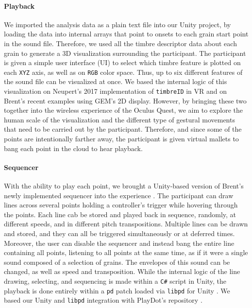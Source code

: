 \documentclass{nime-alternate}
\begin{document}
\paragraph{Playback}

We imported the analysis data as a plain text file into our Unity project, by loading the data into internal arrays that point to onsets to each grain start point in the sound file. Therefore, we used all the timbre descriptor data about each grain to generate a 3D visualization surrounding the participant. The participant is given a simple user interface (UI) to select which timbre feature is plotted on each \texttt{XYZ} axis, as well as on \texttt{RGB} color space. Thus, up to six different features of the sound file can be visualized at once. We based the internal logic of this visualization on Neupert's 2017 implementation of \texttt{timbreID} in VR and on Brent's recent examples using GEM's 2D display. However, by bringing these two together into the wireless experience of the Oculus Quest, we aim to explore the human scale of the visualization and the different type of gestural movements that need to be carried out by the participant. Therefore, and since some of the points are intentionally farther away, the participant is given virtual mallets to bang each point in the cloud to hear playback.

\paragraph{Sequencer}

With the ability to play each point, we brought a Unity-based version of Brent's newly implemented sequencer into the experience \cite{wbrent2019}. The participant can draw lines across several points holding a controller's trigger while hovering through the points. Each line cab be stored and played back in sequence, randomly, at different speeds, and in different pitch transpositions. Multiple lines can be drawn and stored, and they can all be triggered simultaneously or at deferred times. Moreover, the user can disable the sequencer and instead bang the entire line containing all points, listening to all points at the same time, as if it were a single sound composed of a selection of grains. The envelopes of this sound can be changed, as well as speed and transposition. While the internal logic of the line drawing, selecting, and sequencing is made within a \texttt{C\#} script in Unity, the playback is done entirely within a \texttt{pd} patch loaded via \texttt{libpd} for Unity \cite{libpd2019}. We based our Unity and \texttt{libpd} integration with PlayDot's repository \cite{playdots2019}.
\end{document}
